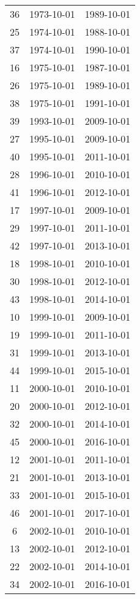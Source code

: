 % 
\begin{tabular}{ccc}
  \hline
  \hline
36 & 1973-10-01 & 1989-10-01 \\ 
  25 & 1974-10-01 & 1988-10-01 \\ 
  37 & 1974-10-01 & 1990-10-01 \\ 
  16 & 1975-10-01 & 1987-10-01 \\ 
  26 & 1975-10-01 & 1989-10-01 \\ 
  38 & 1975-10-01 & 1991-10-01 \\ 
  39 & 1993-10-01 & 2009-10-01 \\ 
  27 & 1995-10-01 & 2009-10-01 \\ 
  40 & 1995-10-01 & 2011-10-01 \\ 
  28 & 1996-10-01 & 2010-10-01 \\ 
  41 & 1996-10-01 & 2012-10-01 \\ 
  17 & 1997-10-01 & 2009-10-01 \\ 
  29 & 1997-10-01 & 2011-10-01 \\ 
  42 & 1997-10-01 & 2013-10-01 \\ 
  18 & 1998-10-01 & 2010-10-01 \\ 
  30 & 1998-10-01 & 2012-10-01 \\ 
  43 & 1998-10-01 & 2014-10-01 \\ 
  10 & 1999-10-01 & 2009-10-01 \\ 
  19 & 1999-10-01 & 2011-10-01 \\ 
  31 & 1999-10-01 & 2013-10-01 \\ 
  44 & 1999-10-01 & 2015-10-01 \\ 
  11 & 2000-10-01 & 2010-10-01 \\ 
  20 & 2000-10-01 & 2012-10-01 \\ 
  32 & 2000-10-01 & 2014-10-01 \\ 
  45 & 2000-10-01 & 2016-10-01 \\ 
  12 & 2001-10-01 & 2011-10-01 \\ 
  21 & 2001-10-01 & 2013-10-01 \\ 
  33 & 2001-10-01 & 2015-10-01 \\ 
  46 & 2001-10-01 & 2017-10-01 \\ 
  6 & 2002-10-01 & 2010-10-01 \\ 
  13 & 2002-10-01 & 2012-10-01 \\ 
  22 & 2002-10-01 & 2014-10-01 \\ 
  34 & 2002-10-01 & 2016-10-01 \\ 

\end{tabular}
